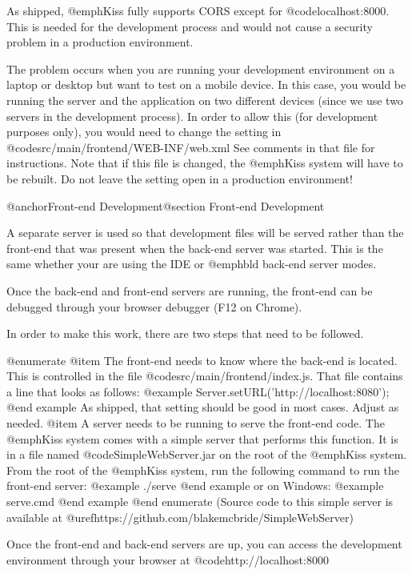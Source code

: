 As shipped, @emph{Kiss} fully supports CORS except for
@code{localhost:8000}.  This is needed for the development process and
would not cause a security problem in a production environment.

The problem occurs when you are running your development environment
on a laptop or desktop but want to test on a mobile device.  In this
case, you would be running the server and the application on two
different devices (since we use two servers in the development
process).  In order to allow this (for development purposes only), you
would need to change the setting in
@code{src/main/frontend/WEB-INF/web.xml} See comments in that file for
instructions.  Note that if this file is changed, the @emph{Kiss}
system will have to be rebuilt.  Do not leave the setting open in a
production environment!

@anchor{Front-end Development}@section Front-end Development

A separate server is used so that development files will be served
rather than the front-end that was present when the back-end server
was started.  This is the same whether your are using the IDE or
@emph{bld} back-end server modes.

Once the back-end and front-end servers are running, the front-end can
be debugged through your browser debugger (F12 on Chrome).

In order to make this work, there are two steps that
need to be followed.

@enumerate
@item
The front-end needs to know where the back-end is located.  This is
controlled in the file @code{src/main/frontend/index.js}.  That file
contains a line that looks as follows:
@example
    Server.setURL('http://localhost:8080');
@end example
As shipped, that setting should be good in most cases.  Adjust as needed.
@item
A server needs to be running to serve the front-end code.  The
@emph{Kiss} system comes with a simple server that performs this
function.  It is in a file named @code{SimpleWebServer.jar} on the
root of the @emph{Kiss} system.  From the root of the @emph{Kiss}
system, run the following command to run the front-end server:
@example
   ./serve
@end example
or on Windows:
@example
   serve.cmd
@end example
@end enumerate
(Source code to this simple server is available at 
@uref{https://github.com/blakemcbride/SimpleWebServer})

Once the front-end and back-end servers are up, you can access the development
environment through your browser at @code{http://localhost:8000}

